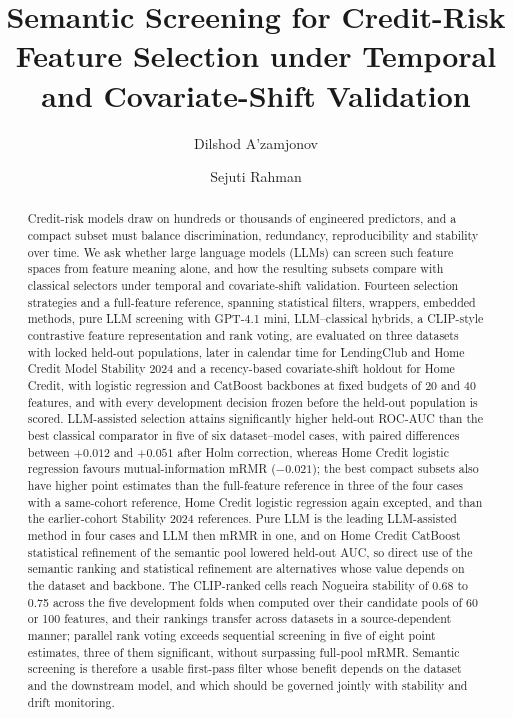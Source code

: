 \documentclass[final,5p,twocolumn]{elsarticle}
\begin{document}
\begin{frontmatter}

\title{Semantic Screening for Credit-Risk Feature Selection under Temporal and Covariate-Shift Validation}

\author[aff1]{Dilshod A'zamjonov}

\author[aff2]{Sejuti Rahman}


\address[aff1]{Department of Engineering, New Uzbekistan University, 1 Movarounnahr Street, Mirzo Ulugbek District, Tashkent, Uzbekistan}
\address[aff2]{Department of Computing, New Uzbekistan University, 1 Movarounnahr Street, Mirzo Ulugbek District, Tashkent, Uzbekistan}

\begin{abstract}
Credit-risk models draw on hundreds or thousands of engineered predictors, and a compact subset must balance discrimination, redundancy, reproducibility and stability over time. We ask whether large language models (LLMs) can screen such feature spaces from feature meaning alone, and how the resulting subsets compare with classical selectors under temporal and covariate-shift validation. Fourteen selection strategies and a full-feature reference, spanning statistical filters, wrappers, embedded methods, pure LLM screening with GPT-4.1 mini, LLM--classical hybrids, a CLIP-style contrastive feature representation and rank voting, are evaluated on three datasets with locked held-out populations, later in calendar time for LendingClub and Home Credit Model Stability 2024 and a recency-based covariate-shift holdout for Home Credit, with logistic regression and CatBoost backbones at fixed budgets of 20 and 40 features, and with every development decision frozen before the held-out population is scored. LLM-assisted selection attains significantly higher held-out ROC-AUC than the best classical comparator in five of six dataset--model cases, with paired differences between $+0.012$ and $+0.051$ after Holm correction, whereas Home Credit logistic regression favours mutual-information mRMR ($-0.021$); the best compact subsets also have higher point estimates than the full-feature reference in three of the four cases with a same-cohort reference, Home Credit logistic regression again excepted, and than the earlier-cohort Stability 2024 references. Pure LLM is the leading LLM-assisted method in four cases and LLM then mRMR in one, and on Home Credit CatBoost statistical refinement of the semantic pool lowered held-out AUC, so direct use of the semantic ranking and statistical refinement are alternatives whose value depends on the dataset and backbone. The CLIP-ranked cells reach Nogueira stability of 0.68 to 0.75 across the five development folds when computed over their candidate pools of 60 or 100 features, and their rankings transfer across datasets in a source-dependent manner; parallel rank voting exceeds sequential screening in five of eight point estimates, three of them significant, without surpassing full-pool mRMR. Semantic screening is therefore a usable first-pass filter whose benefit depends on the dataset and the downstream model, and which should be governed jointly with stability and drift monitoring.

\end{abstract}
\end{frontmatter}
\end{document}
